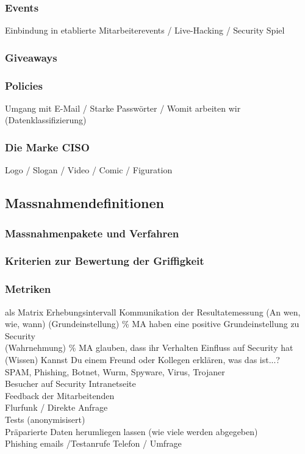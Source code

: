 \documentclass[../../main.tex]{subfiles}
\begin{document}
\subsubsection{Events}
    Einbindung in etablierte Mitarbeiterevents / Live-Hacking / Security Spiel
\subsubsection{Giveaways}
\subsubsection{Policies}
    Umgang mit E-Mail / Starke Passwörter / Womit arbeiten wir (Datenklassifizierung)
\subsubsection{Die Marke CISO}
    Logo / Slogan / Video / Comic / Figuration
\subsection{Massnahmendefinitionen}
\subsubsection{Massnahmenpakete und Verfahren}
\subsubsection{Kriterien zur Bewertung der Griffigkeit}
\subsubsection{Metriken}
  als Matrix
  Erhebungsintervall
  Kommunikation der Resultatemessung (An wen, wie, wann)
    (Grundeinstellung) \% MA haben eine positive Grundeinstellung zu Security\\
    (Wahrnehmung) \% MA glauben, dass ihr Verhalten Einfluss auf Security hat\\
    (Wissen) Kannst Du einem Freund oder Kollegen erklären, was das ist...?\\
    SPAM, Phishing, Botnet, Wurm, Spyware, Virus, Trojaner\\
    Besucher auf Security Intranetseite\\
    Feedback der Mitarbeitenden\\
      Flurfunk / Direkte Anfrage\\
    Tests (anonymisisert)\\
      Präparierte Daten herumliegen lassen (wie viele werden abgegeben)\\
      Phishing emails /Testanrufe Telefon / Umfrage
\end{document}
